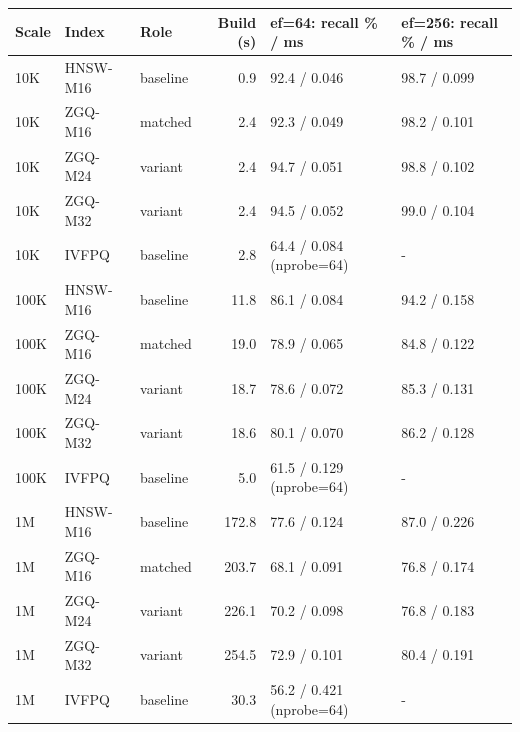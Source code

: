 \begin{tabular}{lllrll}
\hline
Scale & Index & Role & Build (s) & ef=64: recall \% / ms & ef=256: recall \% / ms \\
\hline
10K & HNSW-M16 & baseline & 0.9 & 92.4 / 0.046 & 98.7 / 0.099 \\
10K & ZGQ-M16 & matched & 2.4 & 92.3 / 0.049 & 98.2 / 0.101 \\
10K & ZGQ-M24 & variant & 2.4 & 94.7 / 0.051 & 98.8 / 0.102 \\
10K & ZGQ-M32 & variant & 2.4 & 94.5 / 0.052 & 99.0 / 0.104 \\
10K & IVFPQ & baseline & 2.8 & 64.4 / 0.084 (nprobe=64) & - \\
100K & HNSW-M16 & baseline & 11.8 & 86.1 / 0.084 & 94.2 / 0.158 \\
100K & ZGQ-M16 & matched & 19.0 & 78.9 / 0.065 & 84.8 / 0.122 \\
100K & ZGQ-M24 & variant & 18.7 & 78.6 / 0.072 & 85.3 / 0.131 \\
100K & ZGQ-M32 & variant & 18.6 & 80.1 / 0.070 & 86.2 / 0.128 \\
100K & IVFPQ & baseline & 5.0 & 61.5 / 0.129 (nprobe=64) & - \\
1M & HNSW-M16 & baseline & 172.8 & 77.6 / 0.124 & 87.0 / 0.226 \\
1M & ZGQ-M16 & matched & 203.7 & 68.1 / 0.091 & 76.8 / 0.174 \\
1M & ZGQ-M24 & variant & 226.1 & 70.2 / 0.098 & 76.8 / 0.183 \\
1M & ZGQ-M32 & variant & 254.5 & 72.9 / 0.101 & 80.4 / 0.191 \\
1M & IVFPQ & baseline & 30.3 & 56.2 / 0.421 (nprobe=64) & - \\
\hline
\end{tabular}
